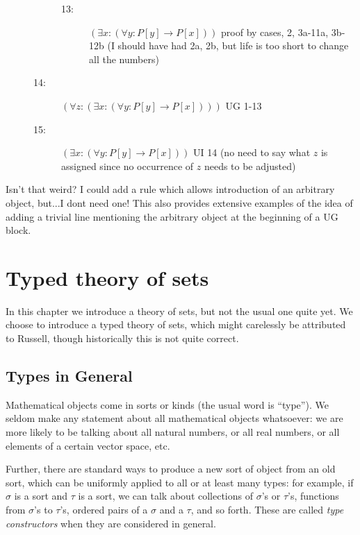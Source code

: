 \documentclass[12pt]{book}
\begin{document}
\begin{description}
\begin{description}
\begin{description}
\begin{description}
\end{description}

\item[13:]  $(\exists x:(\forall y:P[y] \rightarrow P[x]))$  proof by cases, 2, 3a-11a, 3b-12b  (I should have had 2a, 2b, but life is too short to change all the numbers)



\end{description}

\item[14:]  $(\forall z:(\exists x:(\forall y:P[y] \rightarrow P[x])))$ UG 1-13

\item[15:]  $(\exists x:(\forall y:P[y] \rightarrow P[x]))$  UI 14 (no need to say what $z$ is assigned since no occurrence of $z$ needs to be adjusted)

\end{description}

\end{description}

Isn't that weird?  I could add a rule which allows introduction of an arbitrary object, but...I dont need one!  This also provides extensive examples of the idea of adding
a trivial line mentioning the arbitrary object at the beginning of a UG block.





\newpage

\chapter{Typed theory of sets}

In this chapter we introduce a theory of sets, but not the usual one
quite yet.  We choose to introduce a typed theory of sets, which might
carelessly be attributed to Russell, though historically this is not
quite correct.

\section{Types in General}

Mathematical objects come in sorts or kinds (the usual word is
``type'').  We seldom make any statement about all mathematical
objects whatsoever: we are more likely to be talking about all natural
numbers, or all real numbers, or all elements of a certain vector space, etc.

Further, there are standard ways to produce a new sort of object from an old sort, which can be uniformly applied to all or at least many types:  for example,
if $\sigma$ is a sort and $\tau$ is a sort, we can talk about collections of $\sigma$'s or $\tau$'s,  functions from $\sigma$'s to $\tau$'s, ordered pairs of a $\sigma$ and a $\tau$, and so forth.  These are called {\em type constructors\/} when they are considered in general.
\end{document}
